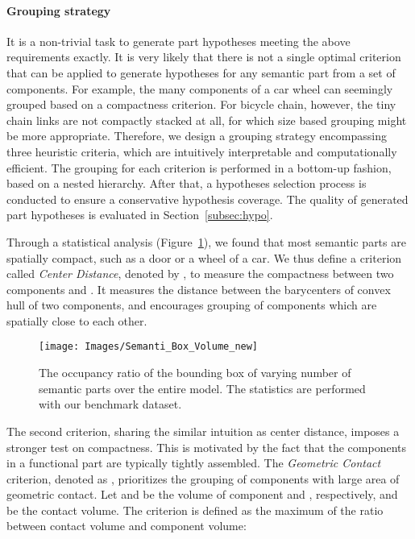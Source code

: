 \documentclass[acmtog]{acmart}
\newcommand{\new}[1]{{\color{black}#1}}
\begin{document}
\paragraph{\textbf{Grouping strategy}}
It is a non-trivial task to generate part hypotheses meeting the above requirements exactly.
It is very likely that there is not a single optimal criterion that
can be applied to generate hypotheses for any semantic part from a set of components.
For example, the many components of a car wheel can seemingly grouped based on a compactness criterion.
For bicycle chain, however, the tiny chain links are not compactly stacked at all,
for which size based grouping might be more appropriate.
Therefore, we design a grouping strategy encompassing three heuristic criteria,
which are intuitively interpretable and computationally efficient.
The grouping for each criterion is performed in a bottom-up fashion, based on a nested hierarchy.
After that, a hypotheses selection process is conducted to
ensure a conservative hypothesis coverage.
The quality of generated part hypotheses is evaluated in Section~\ref{subsec:hypo}.

Through a statistical analysis (Figure~\ref{fig:box_volume}),
we found that most semantic parts are spatially compact, such as a door or a wheel of a car.
We thus define a criterion called \emph{Center Distance}, denoted by ,
to measure the compactness between two components  and .
It measures the distance between the barycenters of convex hull of two components,
and encourages grouping of components which are spatially close to each other.



\begin{figure}[t!]
  \centering
  \texttt{[image: Images/Semanti\_Box\_Volume\_new]}
  \caption{\new{The occupancy ratio of the bounding box of varying number of semantic parts over the entire model. The statistics are performed with our benchmark dataset.}}
  \label{fig:box_volume}
\end{figure}



The second criterion, sharing the similar intuition as center distance, imposes a stronger
test on compactness.
This is motivated by the fact that
the components in a functional part are typically tightly assembled.
The \emph{Geometric Contact} criterion, denoted as ,
prioritizes the grouping of components with large area of geometric contact.
Let  and  be the volume of component  and , respectively,
and  be the contact volume.
The criterion is defined as the maximum of the ratio between contact volume and component volume:
\end{document}
